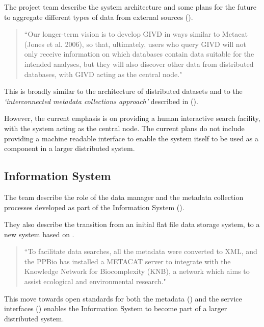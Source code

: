 \documentclass{article}
\begin{document}
The \cite{givd} project team describe the system architecture and some plans
for the future to aggregate different types of data from external sources
(\cite{dengler-2011}).

\begin{quote}
``Our longer-term vision is to develop GIVD in ways similar to Metacat
(Jones et al. 2006), so that, ultimately, users who query GIVD will not
only receive information on which databases contain data suitable for the
intended analyses, but they will also discover other data from distributed
databases, with GIVD acting as the central node."
\end{quote}

This is broadly similar to the \cite{vo} architecture of distributed datasets
and to the \textit{`interconnected metadata collections approach'} described
in (\cite{jones-2006}).

However, the current emphasis is on providing a human interactive
search facility, with the \cite{givd} system acting as the central node.
The current plans do not include providing a machine readable interface
to enable the \cite{givd} system itself to be used as a component in a
larger distributed system.

\subsection{\cite{ppbio} Information System}

The \cite{ppbio} team describe the role of the data manager and the metadata
collection processes developed as part of the \cite{ppbio} Information System
(\cite{pezzini-2012}).

They also describe the transition from an initial flat file data storage
system, to a new system based on \cite{metacat}.

\begin{quote}
``To facilitate data searches, all the metadata were converted to XML, and
the PPBio has installed a METACAT server to integrate with the Knowledge
Network for Biocomplexity (KNB), a network which aims to assist ecological
and environmental research."
\end{quote}

This move towards open standards for both the metadata (\cite{eml}) and the
service interfaces (\cite{metacat}) enables the \cite{ppbio} Information
System to become part of a larger distributed system.

\subsection{}
\end{document}
